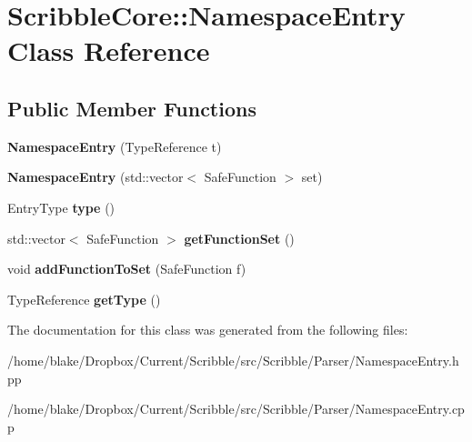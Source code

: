 \hypertarget{class_scribble_core_1_1_namespace_entry}{\section{Scribble\-Core\-:\-:Namespace\-Entry Class Reference}
\label{class_scribble_core_1_1_namespace_entry}
}
\subsection*{Public Member Functions}
\begin{DoxyCompactItemize}
\item 
\hypertarget{class_scribble_core_1_1_namespace_entry_a3b2f1f0b64710dfa3c2b957904837300}{{\bfseries Namespace\-Entry} (Type\-Reference t)}\label{class_scribble_core_1_1_namespace_entry_a3b2f1f0b64710dfa3c2b957904837300}

\item 
\hypertarget{class_scribble_core_1_1_namespace_entry_a621477f47ab28b4c3ccc8fdd627c8818}{{\bfseries Namespace\-Entry} (std\-::vector$<$ Safe\-Function $>$ set)}\label{class_scribble_core_1_1_namespace_entry_a621477f47ab28b4c3ccc8fdd627c8818}

\item 
\hypertarget{class_scribble_core_1_1_namespace_entry_a399830ab468bd22366cc50cdad363b06}{Entry\-Type {\bfseries type} ()}\label{class_scribble_core_1_1_namespace_entry_a399830ab468bd22366cc50cdad363b06}

\item 
\hypertarget{class_scribble_core_1_1_namespace_entry_a471dfc3ce9fabab6224d717be3ce7c6d}{std\-::vector$<$ Safe\-Function $>$ {\bfseries get\-Function\-Set} ()}\label{class_scribble_core_1_1_namespace_entry_a471dfc3ce9fabab6224d717be3ce7c6d}

\item 
\hypertarget{class_scribble_core_1_1_namespace_entry_a7d8a80a9b2a9b8dd9ee86a378684fad7}{void {\bfseries add\-Function\-To\-Set} (Safe\-Function f)}\label{class_scribble_core_1_1_namespace_entry_a7d8a80a9b2a9b8dd9ee86a378684fad7}

\item 
\hypertarget{class_scribble_core_1_1_namespace_entry_a3f8b0e939240396169df70165c8b47da}{Type\-Reference {\bfseries get\-Type} ()}\label{class_scribble_core_1_1_namespace_entry_a3f8b0e939240396169df70165c8b47da}

\end{DoxyCompactItemize}


The documentation for this class was generated from the following files\-:\begin{DoxyCompactItemize}
\item 
/home/blake/\-Dropbox/\-Current/\-Scribble/src/\-Scribble/\-Parser/Namespace\-Entry.\-hpp\item 
/home/blake/\-Dropbox/\-Current/\-Scribble/src/\-Scribble/\-Parser/Namespace\-Entry.\-cpp\end{DoxyCompactItemize}
